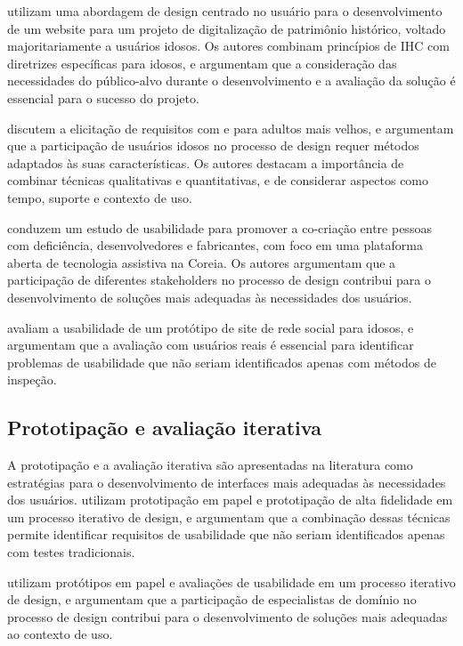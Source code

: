 \cite{shi2016supporting} utilizam uma abordagem de design centrado no usuário para o desenvolvimento de um website para um projeto de digitalização de patrimônio histórico, voltado majoritariamente a usuários idosos. Os autores combinam princípios de IHC com diretrizes específicas para idosos, e argumentam que a consideração das necessidades do público-alvo durante o desenvolvimento e a avaliação da solução é essencial para o sucesso do projeto.

\cite{sustar2008requirements} discutem a elicitação de requisitos com e para adultos mais velhos, e argumentam que a participação de usuários idosos no processo de design requer métodos adaptados às suas características. Os autores destacam a importância de combinar técnicas qualitativas e quantitativas, e de considerar aspectos como tempo, suporte e contexto de uso.

\cite{ro2024usability} conduzem um estudo de usabilidade para promover a co-criação entre pessoas com deficiência, desenvolvedores e fabricantes, com foco em uma plataforma aberta de tecnologia assistiva na Coreia. Os autores argumentam que a participação de diferentes stakeholders no processo de design contribui para o desenvolvimento de soluções mais adequadas às necessidades dos usuários.

\cite{arfaa2015usability} avaliam a usabilidade de um protótipo de site de rede social para idosos, e argumentam que a avaliação com usuários reais é essencial para identificar problemas de usabilidade que não seriam identificados apenas com métodos de inspeção.

\subsection{Prototipação e avaliação iterativa}

\label{sec:prototipacao}

A prototipação e a avaliação iterativa são apresentadas na literatura como estratégias para o desenvolvimento de interfaces mais adequadas às necessidades dos usuários. \cite{balakrishnan2012user} utilizam prototipação em papel e prototipação de alta fidelidade em um processo iterativo de design, e argumentam que a combinação dessas técnicas permite identificar requisitos de usabilidade que não seriam identificados apenas com testes tradicionais.

\cite{kymäläinen2012creating} utilizam protótipos em papel e avaliações de usabilidade em um processo iterativo de design, e argumentam que a participação de especialistas de domínio no processo de design contribui para o desenvolvimento de soluções mais adequadas ao contexto de uso.

